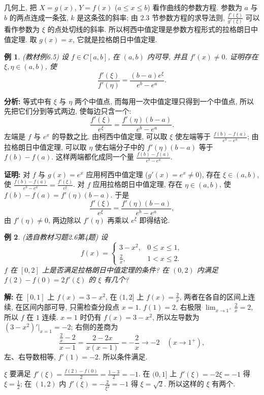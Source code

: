 \documentclass[UTF8,openany]{ctexbook}
\theoremstyle{chinesetextbook}
\newtheorem{example}{例}[section]
\newenvironment{cnproof}{\par\indent\textbf{证明:} \ignorespaces}{\par}
\newenvironment{cnsolution}{\par\indent\textbf{解:} \ignorespaces}{\par}
\begin{document}
几何上, 把 $X=g(x)$, $Y=f(x)$ ($a\le x\le b$) 看作曲线的参数方程. 参数为 $a$ 与 $b$ 的两点连成一条弦, $k$ 是这条弦的斜率; 由 2.3 节参数方程的求导法则, $\displaystyle\frac{f'(\xi)}{g'(\xi)}$ 可以看作参数为 $\xi$ 的点处切线的斜率. 所以柯西中值定理是参数方程形式的拉格朗日中值定理. 取 $g(x)=x$, 它就是拉格朗日中值定理.
\begin{example}\label{ex:c2-6-5}
\textnormal{(教材例6.5)} 设 $f\in C[a,b]$, 在 $(a,b)$ 内可导, 并且 $f'(x)\ne0$. 证明存在 $\xi,\eta\in(a,b)$, 使
\[
\frac{f'(\xi)}{f'(\eta)}=\frac{(b-a)e^\xi}{e^b-e^a}.
\]
\end{example}
\par\indent\textbf{分析:} 等式中有 $\xi$ 与 $\eta$ 两个中值点, 而每用一次中值定理只得到一个中值点, 所以先把它们分到等式两边, 使每边只含一个:
\[
\frac{f'(\xi)}{e^\xi}=\frac{f'(\eta)(b-a)}{e^b-e^a}.
\]
左端是 $f$ 与 $e^x$ 的导数之比. 由柯西中值定理, 可以取 $\xi$ 使左端等于 $\displaystyle\frac{f(b)-f(a)}{e^b-e^a}$; 由拉格朗日中值定理, 可以取 $\eta$ 使右端分子中的 $f'(\eta)(b-a)$ 等于 $f(b)-f(a)$. 这样两端都化成同一个量 $\displaystyle\frac{f(b)-f(a)}{e^b-e^a}$.
\begin{cnproof}
对 $f$ 与 $g(x)=e^x$ 应用柯西中值定理 ($g'(x)=e^x\ne0$), 存在 $\xi\in(a,b)$, 使 $\displaystyle\frac{f(b)-f(a)}{e^b-e^a}=\frac{f'(\xi)}{e^\xi}$. 对 $f$ 应用拉格朗日中值定理, 存在 $\eta\in(a,b)$, 使 $f(b)-f(a)=f'(\eta)(b-a)$. 于是
\[
\frac{f'(\xi)}{e^\xi}=\frac{f'(\eta)(b-a)}{e^b-e^a},
\]
由 $f'(\eta)\ne0$, 两边除以 $f'(\eta)$ 再乘以 $e^\xi$ 即得结论.
\end{cnproof}
\begin{example}\label{ex:c2-h6-4}
\textnormal{(选自教材习题2.6第4题)} 设
\[
f(x)=\begin{cases}3-x^2,&0\le x\le1,\\\frac2x,&1<x\le2.\end{cases}
\]
$f$ 在 $[0,2]$ 上是否满足拉格朗日中值定理的条件? 在 $(0,2)$ 内满足 $f(2)-f(0)=2f'(\xi)$ 的 $\xi$ 有几个?
\end{example}
\begin{cnsolution}
在 $[0,1]$ 上 $f(x)=3-x^2$, 在 $(1,2]$ 上 $\displaystyle f(x)=\frac2x$, 两者在各自的区间上连续, 在区间内部可导, 只需检查分段点 $x=1$. $f(1)=2$, 右极限 $\displaystyle\lim_{x\to1^+}\frac2x=2$, 所以 $f$ 在 $1$ 连续. $x=1$ 时仍有 $f(x)=3-x^2$, 所以左导数为 $(3-x^2)'\big|_{x=1}=-2$; 右侧的差商为
\[
\frac{\frac2x-2}{x-1}=\frac{2-2x}{x(x-1)}=-\frac2x\to-2\quad(x\to1^+),
\]
左、右导数相等, $f'(1)=-2$. 所以条件满足.

$\xi$ 要满足 $\displaystyle f'(\xi)=\frac{f(2)-f(0)}2=\frac{1-3}2=-1$. 在 $(0,1]$ 上 $f'(\xi)=-2\xi=-1$ 得 $\displaystyle\xi=\frac12$; 在 $(1,2)$ 内 $\displaystyle f'(\xi)=-\frac2{\xi^2}=-1$ 得 $\xi=\sqrt2$. 所以这样的 $\xi$ 有两个.
\end{cnsolution}
\end{document}
